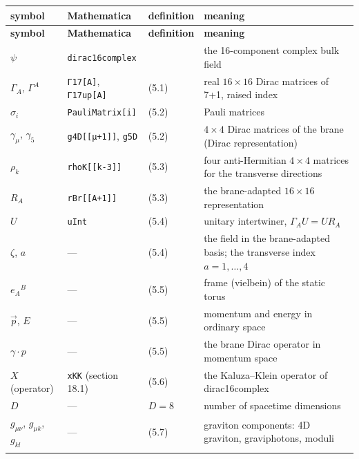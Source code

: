 \documentclass[10pt,a4paper]{article}
\begin{document}
{\small
\begin{longtable}{>{\raggedright\arraybackslash}p{}>{\raggedright\arraybackslash}p{}>{\raggedright\arraybackslash}p{}>{\raggedright\arraybackslash}p{}}
\toprule
\textbf{symbol} & \textbf{Mathematica} & \textbf{definition} & \textbf{meaning} \\
\midrule\endfirsthead
\toprule
\textbf{symbol} & \textbf{Mathematica} & \textbf{definition} & \textbf{meaning} \\
\midrule\endhead
\endfoot
\bottomrule\endlastfoot
$\psi$ & \texttt{dirac16complex} &  & the 16-component complex bulk field \\
$\Gamma_A$, $\Gamma^A$ & \texttt{Γ17[A]}, \texttt{Γ17up[A]} & (5.1) & real $16\times16$ Dirac matrices of 7+1, raised index \\
$\sigma_i$ & \texttt{PauliMatrix[i]} & (5.2) & Pauli matrices \\
$\gamma_\mu$, $\gamma_5$ & \texttt{g4D[[μ+1]]}, \texttt{g5D} & (5.2) & $4\times4$ Dirac matrices of the brane (Dirac representation) \\
$\rho_k$ & \texttt{rhoK[[k-3]]} & (5.3) & four anti-Hermitian $4\times4$ matrices for the transverse directions \\
$R_A$ & \texttt{rBr[[A+1]]} & (5.3) & the brane-adapted $16\times16$ representation \\
$U$ & \texttt{uInt} & (5.4) & unitary intertwiner, $\Gamma_AU=UR_A$ \\
$\zeta$, $a$ & — & (5.4) & the field in the brane-adapted basis; the transverse index $a=1,\dots,4$ \\
$e_A{}^B$ & — & (5.5) & frame (vielbein) of the static torus \\
$\vec p$, $E$ & — & (5.5) & momentum and energy in ordinary space \\
$\gamma\cdot p$ & — & (5.5) & the brane Dirac operator in momentum space \\
$X$ (operator) & \texttt{xKK} (section 18.1) & (5.6) & the Kaluza–Klein operator of dirac16complex \\
$D$ & — & $D=8$ & number of spacetime dimensions \\
$g_{\mu\nu}$, $g_{\mu k}$, $g_{kl}$ & — & (5.7) & graviton components: 4D graviton, graviphotons, moduli \\*
\end{longtable}}
\end{document}
